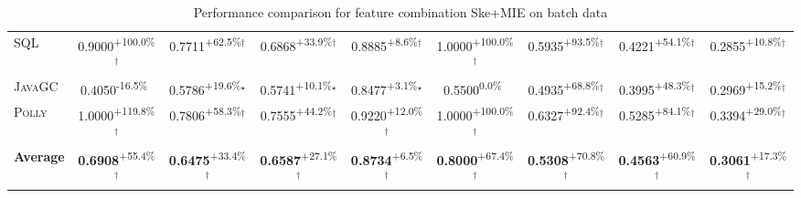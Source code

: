 \begin{table}[htbp]
\begin{tabular}{l|cccc|cccc}
\textsc{SQL} & \cellcolor{green!30}0.9000\textsuperscript{+100.0\%}$^\dagger$ & \cellcolor{green!30}0.7711\textsuperscript{+62.5\%}$^\dagger$ & \cellcolor{green!30}0.6868\textsuperscript{+33.9\%}$^\dagger$ & \cellcolor{green!30}0.8885\textsuperscript{+8.6\%}$^\dagger$ & \cellcolor{green!30}1.0000\textsuperscript{+100.0\%}$^\dagger$ & \cellcolor{green!30}0.5935\textsuperscript{+93.5\%}$^\dagger$ & \cellcolor{green!30}0.4221\textsuperscript{+54.1\%}$^\dagger$ & \cellcolor{green!30}0.2855\textsuperscript{+10.8\%}$^\dagger$ \\
\textsc{JavaGC} & \cellcolor{red!30}0.4050\textsuperscript{-16.5\%}$^{\,\,\,}$ & \cellcolor{green!30}0.5786\textsuperscript{+19.6\%}$^\star$ & \cellcolor{green!30}0.5741\textsuperscript{+10.1\%}$^\star$ & \cellcolor{green!30}0.8477\textsuperscript{+3.1\%}$^\star$ & \cellcolor{red!30}0.5500\textsuperscript{0.0\%}$^{\,\,\,}$ & \cellcolor{green!30}0.4935\textsuperscript{+68.8\%}$^\dagger$ & \cellcolor{green!30}0.3995\textsuperscript{+48.3\%}$^\dagger$ & \cellcolor{green!30}0.2969\textsuperscript{+15.2\%}$^\dagger$ \\
\textsc{Polly} & \cellcolor{green!30}1.0000\textsuperscript{+119.8\%}$^\dagger$ & \cellcolor{green!30}0.7806\textsuperscript{+58.3\%}$^\dagger$ & \cellcolor{green!30}0.7555\textsuperscript{+44.2\%}$^\dagger$ & \cellcolor{green!30}0.9220\textsuperscript{+12.0\%}$^\dagger$ & \cellcolor{green!30}1.0000\textsuperscript{+100.0\%}$^\dagger$ & \cellcolor{green!30}0.6327\textsuperscript{+92.4\%}$^\dagger$ & \cellcolor{green!30}0.5285\textsuperscript{+84.1\%}$^\dagger$ & \cellcolor{green!30}0.3394\textsuperscript{+29.0\%}$^\dagger$ \\
\hline
\textbf{Average} & \cellcolor{green!30}\textbf{0.6908}\textsuperscript{+55.4\%}$^\dagger$ & \cellcolor{green!30}\textbf{0.6475}\textsuperscript{+33.4\%}$^\dagger$ & \cellcolor{green!30}\textbf{0.6587}\textsuperscript{+27.1\%}$^\dagger$ & \cellcolor{green!30}\textbf{0.8734}\textsuperscript{+6.5\%}$^\dagger$ & \cellcolor{green!30}\textbf{0.8000}\textsuperscript{+67.4\%}$^\dagger$ & \cellcolor{green!30}\textbf{0.5308}\textsuperscript{+70.8\%}$^\dagger$ & \cellcolor{green!30}\textbf{0.4563}\textsuperscript{+60.9\%}$^\dagger$ & \cellcolor{green!30}\textbf{0.3061}\textsuperscript{+17.3\%}$^\dagger$ \\
\hline
\end{tabular}
\caption{Performance comparison for feature combination Ske+MIE on batch data}
\label{tab:combo_Ske_MIE_performance_batch}
\end{table}